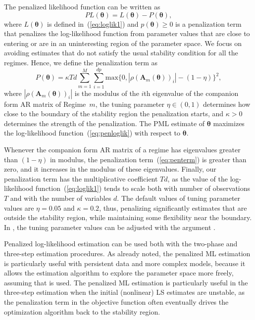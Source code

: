 \documentclass[nojss]{jss}
\begin{document}
The penalized likelihood function can be written as
\begin{equation}\label{eq:penloglik}
PL(\boldsymbol{\theta}) = L(\boldsymbol{\theta}) - P(\boldsymbol{\theta}),
\end{equation}
where $L(\boldsymbol{\theta})$ is defined in~(\ref{eq:loglik1}) and $p(\boldsymbol{\theta})\geq 0$ is a penalization term that penalizes the log-likelihood function from parameter values that are close to entering or are in an uninteresting region of the parameter space. We focus on avoiding estimates that do not satisfy the usual stability condition for all the regimes. Hence, we define the penalization term as
\begin{equation}\label{eq:penterm}
P(\boldsymbol{\theta}) = \kappa Td \sum_{m=1}^M\sum_{i=1}^{dp} \text{max}\lbrace 0, |\rho(\boldsymbol{A}_m(\boldsymbol{\theta}))_i| - (1 - \eta) \rbrace^2,
\end{equation}
where $|\rho(\boldsymbol{A}_m(\boldsymbol{\theta}))_i|$ is the modulus of the $i$th eigenvalue of the companion form AR matrix of Regime~$m$, the tuning parameter $\eta\in (0, 1)$ determines how close to the boundary of the stability region the penalization starts, and $\kappa>0$ determines the strength of the penalization. The PML estimate of $\boldsymbol{\theta}$ maximizes the log-likelihood function~(\ref{eq:penloglik}) with respect to $\boldsymbol{\theta}$.

Whenever the companion form AR matrix of a regime has eigenvalues greater than $(1 - \eta)$ in modulus, the penalization term~(\ref{eq:penterm}) is greater than zero, and it increases in the modulus of these eigenvalues. Finally, our penalization term has the multiplicative coefficient $Td$, as the value of the log-likelihood function~(\ref{eq:loglik1}) tends to scale both with number of observations $T$ and with the number of variables $d$. The default values of tuning parameter values are $\eta = 0.05$ and $\kappa = 0.2$, thus, penalizing significantly estimates that are outside the stability region, while maintaining some flexibility near the boundary. In , the tuning parameter values can be adjusted with the argument .

Penalized log-likelihood estimation can be used both with the two-phase and three-step estimation procedures. As already noted, the penalized ML estimation is particularly useful with persistent data and more complex models, because it allows the estimation algorithm to explore the parameter space more freely, assuming that  is used. The penalized ML estimation is particularly useful in the three-step estimation when the initial (nonlinear) LS estimates are unstable, as the penalization term in the objective function often eventually drives the optimization algorithm back to the stability region.
\end{document}
